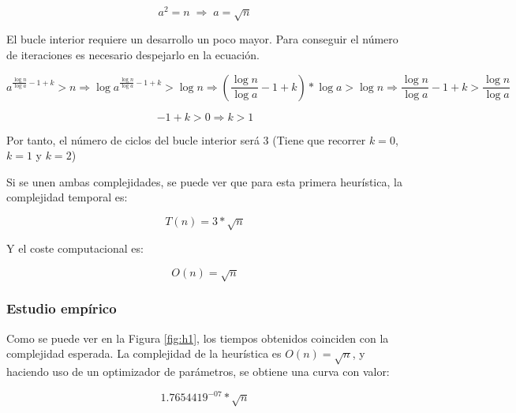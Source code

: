 \documentclass{uc3mpracticas}
\begin{document}
  $$ a^2 = n \; \Rightarrow \; a = \sqrt{n} $$

  El bucle interior requiere un desarrollo un poco mayor. Para conseguir el número de iteraciones es necesario despejarlo en la ecuación.

  \vspace{2mm}

  $$ a^{\frac{\log n}{\log a} - 1 + k} > n \Rightarrow \log a^{\frac{\log n}{\log a} - 1 + k} > \log n \Rightarrow (\frac{\log n}{\log a} - 1 + k) * \log a > \log n \Rightarrow  \frac{\log n}{\log a} - 1 + k > \frac{\log n}{\log a}$$

  $$ -1 + k > 0 \Rightarrow k > 1 $$

  Por tanto, el número de ciclos del bucle interior será 3 (Tiene que recorrer $k=0$, $k=1$ y $k=2$)

  \vspace{2mm}

  Si se unen ambas complejidades, se puede ver que para esta primera heurística, la complejidad temporal es:

  $$ T(n) = \displaystyle 3*\sqrt{n}$$

  Y el coste computacional es:

  $$ O(n) = \sqrt{n}$$


  \subsubsection{Estudio empírico}\label{empirico}

  Como se puede ver en la Figura \ref{fig:h1}, los tiempos obtenidos coinciden con la complejidad esperada. La complejidad de la heurística es $ O(n) = \sqrt{n} $, y haciendo uso de un optimizador de parámetros, se obtiene una curva con valor:

  $$ 1.7654419^{-07} * \sqrt{n} $$

\end{document}
